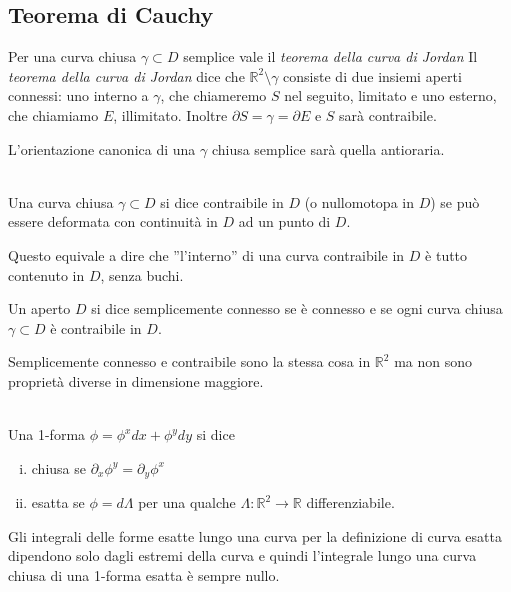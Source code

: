 \documentclass[11pt,a4paper,twoside]{book}
\newenvironment{definizione}[1][\empty]{\begin{Definizione}{
\ifx\empty#1\relax\else\mdseries\itshape#1\\\fi
}{}}{\end{Definizione}}
\theoremstyle{esss}
\theoremstyle{dotless}
\numberwithin{equation}{section} %
\begin{document}
\subsection{Teorema di Cauchy}

Per una curva chiusa $\gamma\subset D$ semplice vale il \textit{teorema della curva di Jordan}
Il \textit{teorema della curva di Jordan} dice che $\mathbb{R}^2\setminus\gamma$ consiste di due insiemi aperti connessi: uno interno a $\gamma$, che chiameremo $S$ nel seguito, limitato  e uno esterno, che chiamiamo $E$, illimitato. Inoltre $\partial S =\gamma=\partial E$ e $S$ sarà contraibile.

L'orientazione canonica di una $\gamma$ chiusa semplice sarà quella antioraria.

\begin{definizione}
Una curva chiusa $\gamma\subset D$ si dice contraibile in $D$ (o nullomotopa in $D$) se può essere deformata con continuità in $D$ ad un punto di $D$.
\end{definizione}
Questo equivale a dire che ''l'interno'' di una curva contraibile in $D$ è tutto contenuto in $D$, senza buchi.


Un aperto $D$ si dice semplicemente connesso se è connesso e se ogni curva chiusa $\gamma\subset D$ è contraibile in $D$.
\par
Semplicemente connesso e contraibile sono la stessa cosa in $\mathbb{R}^2$ ma non sono proprietà diverse in dimensione maggiore.
\begin{definizione}
Una 1-forma $\phi=\phi^x dx + \phi^y dy$ si dice \begin{enumerate}[i.]\item chiusa se $\partial_x \phi^y=\partial_y\phi^x$
\item esatta se $\phi=d\Lambda$ per una qualche $\Lambda:\mathbb{R}^2\rightarrow\mathbb{R}$ differenziabile. 
\end{enumerate}
\end{definizione}
Gli integrali delle forme esatte lungo una curva per la definizione di curva esatta dipendono solo dagli estremi della curva e quindi l'integrale lungo una curva chiusa di una 1-forma esatta è sempre nullo.
\end{document}
